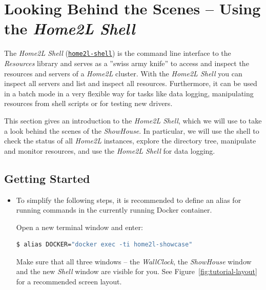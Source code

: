 \documentclass[12pt,english,parskip=half,headheight=19pt]{scrreprt}
\newcommand{\idx}[1]{#1\index{#1}}
\newcommand{\reftool}[1]{\hyperref[tool:#1]{\texttt{\idx{#1}}}}
\begin{document}
\clearpage
\section{Looking Behind the Scenes -- Using the \textit{Home2L Shell}}
\label{sec:tutorial-shell}


The \textit{Home2L Shell} (\reftool{home2l-shell}) is the command line interface to the \textit{Resources} library and serves as a ''swiss army knife'' to access and inspect the resources and servers of a \textit{Home2L} cluster. With the \textit{Home2L Shell} you can inspect all servers and list and inspect all resources. Furthermore, it can be used in a batch mode in a very flexible way for tasks like data logging, manipulating resources from shell scripts or for testing new drivers.

This section gives an introduction to the \textit{Home2L Shell}, which we will use to take a look behind the scenes of the \textit{ShowHouse}. In particular, we will use the shell to check the status of all \textit{Home2L} instances, explore the directory tree, manipulate and monitor resources, and use the \textit{Home2L Shell} for data logging.





\subsection{Getting Started}
\label{sec:tutorial-shell-start}



\begin{itemize}[$\blacktriangleright$]

\item
  To simplify the following steps, it is recommended to define an alias for running
  commands in the currently running Docker container.

  Open a new terminal window and enter:
  \begin{lstlisting}[language=bash]
    $ alias DOCKER="docker exec -ti home2l-showcase"
  \end{lstlisting}
  Make sure that all three windows -- the \textit{WallClock}, the \textit{ShowHouse} window and
  the new \textit{Shell} window are visible for you. See Figure~\ref{fig:tutorial-layout} for
  a recommended screen layout.

\end{itemize}
\end{document}
